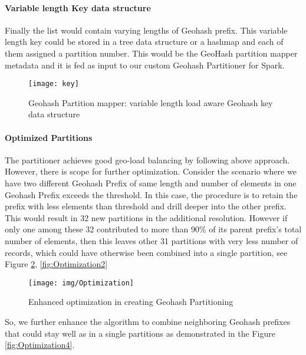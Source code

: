 \documentclass[article,type=msc,colorback,12pt,accentcolor=tud1d]{tudthesis}
\begin{document}
			\clearpage						
				
			\paragraph{Variable length Key data structure}
				\par Finally the list would contain varying lengths of Geohash prefix. This variable length key could be stored in a tree data structure or a hashmap and each of them assigned a partition number. This would be the GeoHash partition mapper metadata and it is fed as input to our custom Geohash Partitioner for Spark. \\
			
					\begin{figure}[h]
						\centering
						\texttt{[image: key]}
						\caption{Geohash Partition mapper: variable length load aware Geohash key data structure}
						\label{fig:keydatastrucutre}
					\end{figure}
			 \clearpage
			\paragraph{Optimized Partitions}
			The partitioner achieves good geo-load balancing by following above approach. However, there is scope for further optimization. Consider the scenario where we have two different Geohash Prefix of same length and number of elements in one Geohash Prefix exceeds the threshold. In this case, the procedure is to retain the prefix with less elements than threshold and drill deeper into the other prefix. This would result in 32 new partitions in the additional resolution. However if only one among these 32 contributed to more than 90\% of its parent prefix's total number of elements, then this leaves other 31 partitions with very less number of records, which could have otherwise been combined into a single partition, see Figure \ref{fig:Optimization}, \ref{fig:Optimization2}
									
				\begin{figure} [h]
				\centering
				\texttt{[image: img/Optimization]}
				\caption{Enhanced optimization in creating Geohash Partitioning}
				\label{fig:Optimization}
				\end{figure}
			So, we further enhance the algorithm to combine neighboring Geohash prefixes that could stay well as in a single partitions as demonstrated in the Figure \ref{fig:Optimization4}.		
			
\end{document}
